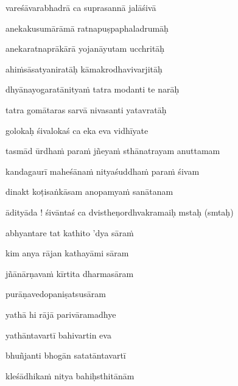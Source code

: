vareśāvarabhadrā ca suprasannā jalāśivā \veg\dontdisplaylinenum

anekakusumārāmā ratnapuṣpaphaladrumāḥ\thinspace{\dandab} \dontdisplaylinenum

anekaratnaprākārā yojanāyutam ucchritāḥ \veg\dontdisplaylinenum

ahiṁsāsatyaniratāḥ kāmakrodhavivarjitāḥ\thinspace{\dandab} \dontdisplaylinenum

dhyānayogaratānityaṁ tatra modanti te narāḥ \veg\dontdisplaylinenum 

tatra gomātaras sarvā nivasanti yatavratāḥ\thinspace{\dandab} \dontdisplaylinenum

golokaḥ śivalokaś ca eka eva vidhīyate \veg\dontdisplaylinenum

tasmād ūrdhaṁ paraṁ jñeyaṁ sthānatrayam anuttamam\thinspace{\dandab} \dontdisplaylinenum

kandagaurī maheśānaṁ nityaśuddhaṁ paraṁ śivam \veg\dontdisplaylinenum

dinakt koṭisaṅkāsam anopamyaṁ sanātanam\thinspace{\dandab} \dontdisplaylinenum

ādityāda ! śivāntaś ca dvistheṇordhvakramaiḥ mstaḥ (smtaḥ) \veg\dontdisplaylinenum


\ujvers\nemsloka 
abhyantare tat kathito 'dya sāraṁ
\dontdisplaylinenum

\nemslokab 
kim anya rājan kathayāmi sāram \danda\dontdisplaylinenum

\nemslokac 
jñānārṇavaṁ kīrtita dharmasāram
\dontdisplaylinenum

\nemslokad 
purāṇavedopaniṣatsusāram \veg\dontdisplaylinenum
{}

\ujvers\nemsloka 
yathā hi rājā parivāramadhye
\dontdisplaylinenum

\nemslokab 
yathāntavartī bahivartin eva \danda\dontdisplaylinenum

\nemslokac 
bhuñjanti bhogān satatāntavartī
\dontdisplaylinenum

\nemslokad 
kleśādhikaṁ nitya bahiḥsthitānām \veg\dontdisplaylinenum
{}

